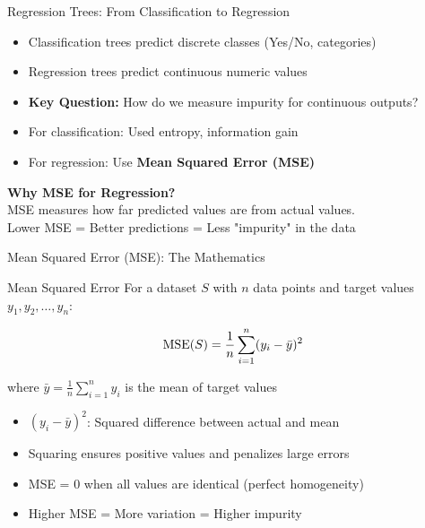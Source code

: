 \documentclass[usenames,dvipsnames]{beamer}
\begin{document}
\begin{frame}{Regression Trees: From Classification to Regression}
\begin{itemize}
	\item \pause Classification trees predict discrete classes (Yes/No, categories)
	\item \pause Regression trees predict continuous numeric values  
	\item \pause \textbf{Key Question:} How do we measure impurity for continuous outputs?
	\item \pause For classification: Used entropy, information gain
	\item \pause For regression: Use \textbf{Mean Squared Error (MSE)}
\end{itemize}

\pause
\begin{keypointsbox}
\textbf{Why MSE for Regression?}\\
MSE measures how far predicted values are from actual values.\\
Lower MSE = Better predictions = Less "impurity" in the data
\end{keypointsbox}
\end{frame}

\begin{frame}{Mean Squared Error (MSE): The Mathematics}
\begin{definitionbox}{Mean Squared Error}
For a dataset $S$ with $n$ data points and target values $y_1, y_2, \ldots, y_n$:

\vspace{0.3cm}
\[
\operatorname{MSE}(S) = \frac{1}{n} \sum_{i=1}^{n} (y_i - \bar{y})^2
\]
\vspace{0.3cm}

where $\bar{y} = \frac{1}{n} \sum_{i=1}^{n} y_i$ is the mean of target values
\end{definitionbox}

\pause
\begin{itemize}
	\item \pause $(y_i - \bar{y})^2$: Squared difference between actual and mean
	\item \pause Squaring ensures positive values and penalizes large errors
	\item \pause MSE = 0 when all values are identical (perfect homogeneity)
	\item \pause Higher MSE = More variation = Higher impurity
\end{itemize}
\end{frame}
\end{document}
